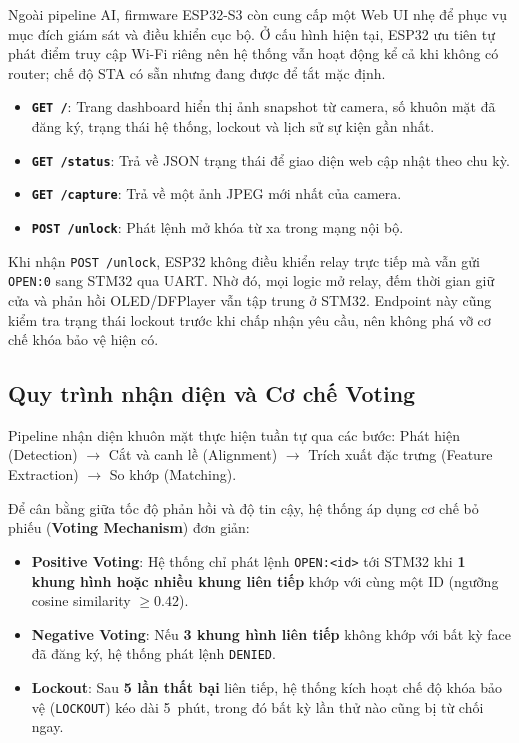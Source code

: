 Ngoài pipeline AI, firmware ESP32-S3 còn cung cấp một Web UI nhẹ để phục vụ mục đích giám sát và điều khiển cục bộ. Ở cấu hình hiện tại, ESP32 ưu tiên tự phát điểm truy cập Wi-Fi riêng nên hệ thống vẫn hoạt động kể cả khi không có router; chế độ STA có sẵn nhưng đang được để tắt mặc định.

\begin{itemize}
  \item \textbf{\texttt{GET /}}: Trang dashboard hiển thị ảnh snapshot từ camera, số khuôn mặt đã đăng ký, trạng thái hệ thống, lockout và lịch sử sự kiện gần nhất.
  \item \textbf{\texttt{GET /status}}: Trả về JSON trạng thái để giao diện web cập nhật theo chu kỳ.
  \item \textbf{\texttt{GET /capture}}: Trả về một ảnh JPEG mới nhất của camera.
  \item \textbf{\texttt{POST /unlock}}: Phát lệnh mở khóa từ xa trong mạng nội bộ.
\end{itemize}

Khi nhận \texttt{POST /unlock}, ESP32 không điều khiển relay trực tiếp mà vẫn gửi \texttt{OPEN:0} sang STM32 qua UART. Nhờ đó, mọi logic mở relay, đếm thời gian giữ cửa và phản hồi OLED/DFPlayer vẫn tập trung ở STM32. Endpoint này cũng kiểm tra trạng thái lockout trước khi chấp nhận yêu cầu, nên không phá vỡ cơ chế khóa bảo vệ hiện có.

\subsection{Quy trình nhận diện và Cơ chế Voting}

Pipeline nhận diện khuôn mặt thực hiện tuần tự qua các bước: Phát hiện (Detection) $\to$ Cắt và canh lề (Alignment) $\to$ Trích xuất đặc trưng (Feature Extraction) $\to$ So khớp (Matching).

Để cân bằng giữa tốc độ phản hồi và độ tin cậy, hệ thống áp dụng cơ chế bỏ phiếu (\textbf{Voting Mechanism}) đơn giản: 
\begin{itemize}
  \item \textbf{Positive Voting}: Hệ thống chỉ phát lệnh \texttt{OPEN:<id>} tới STM32 khi \textbf{1 khung hình hoặc nhiều khung liên tiếp} khớp với cùng một ID (ngưỡng cosine similarity $\geq 0.42$).
  \item \textbf{Negative Voting}: Nếu \textbf{3 khung hình liên tiếp} không khớp với bất kỳ face đã đăng ký, hệ thống phát lệnh \texttt{DENIED}.
  \item \textbf{Lockout}: Sau \textbf{5 lần thất bại} liên tiếp, hệ thống kích hoạt chế độ khóa bảo vệ (\texttt{LOCKOUT}) kéo dài \SI{5}{phút}, trong đó bất kỳ lần thử nào cũng bị từ chối ngay.
\end{itemize}

